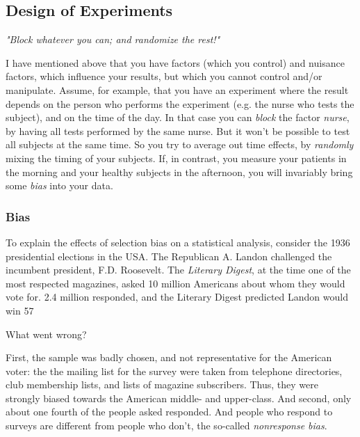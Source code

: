 \subsection{Design of Experiments}

\emph{"Block whatever you can; and randomize the rest!"}

I have mentioned above that you have factors (which you control) and nuisance factors, which influence your results, but which you cannot control and/or manipulate. Assume, for example, that you have an experiment where the result depends on the person who performs the experiment (e.g. the nurse who tests the subject), and on the time of the day. In that case you can \emph{block} the factor \emph{nurse}, by having all tests performed by the same nurse. But it won't be possible to test all subjects at the same time. So you try to average out time effects, by \emph{randomly} mixing the timing of your subjects. If, in contrast, you measure your patients in the morning and your healthy subjects in the afternoon, you will invariably bring some \emph{bias} into your data.

\subsubsection{Bias} 
To explain the effects of selection bias on a statistical analysis, consider the 1936 presidential elections in the USA. The Republican A. Landon challenged the incumbent president, F.D. Roosevelt. The \emph{Literary Digest}, at the time one of the most respected magazines, asked 10 million Americans about whom they would vote for. 2.4 million responded, and the Literary Digest predicted Landon would win 57%

What went wrong?

First, the sample was badly chosen, and not representative for the American voter: the the mailing list for the survey were taken from telephone directories, club membership lists, and lists of magazine subscribers. Thus, they were strongly biased towards the American middle- and upper-class. And second, only about one fourth of the people asked responded. And people who respond to surveys are different from people who don't, the so-called \emph{nonresponse bias}.

